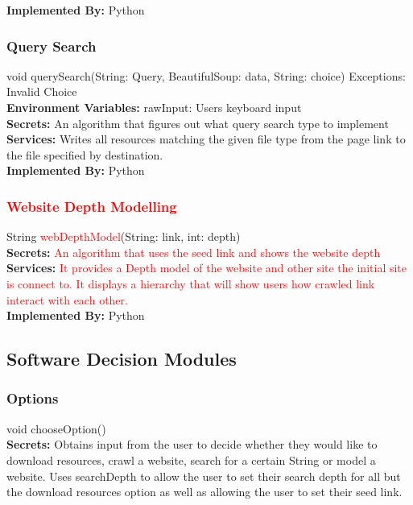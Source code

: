 \documentclass[titlepage]{article}
\begin{document}
\textbf{Implemented By:} Python

\subsubsection{Query Search}
void querySearch(String: Query, BeautifulSoup: data, String: choice) Exceptions: Invalid Choice\\

\textbf{Environment Variables:}
rawInput: Users keyboard input\\

\textbf{Secrets:}
An algorithm that figures out what query search type to implement \\

\textbf{Services:}
Writes all resources matching the given file type from the page link to the file specified by destination.\\

\textbf{Implemented By:}
Python

\subsubsection{\textcolor{red}{Website Depth Modelling}}
String \textcolor{red}{webDepthModel}(String: link, int: depth)\\

\textbf{Secrets:}
 \textcolor{red}{An algorithm that uses the seed link and shows the website depth}\\
 
\textbf{Services:}
\textcolor{red}{It provides a Depth model of the website and other site the initial site is connect to. It displays a hierarchy that will show users how crawled link interact with each other.}\\

\textbf{Implemented By:}
Python

\subsection{Software Decision Modules}
\subsubsection{Options}
void chooseOption()\\

\textbf{Secrets:}
Obtains input from the user to decide whether they would like to download resources, crawl a website, search for a certain String or model a website. Uses searchDepth to allow the user to set their search depth for all but the download resources option as well as allowing the user to set their seed link.\\
\end{document}
